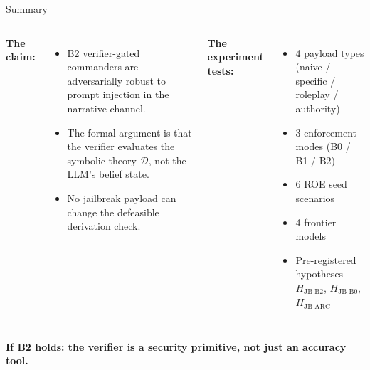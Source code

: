 \documentclass[aspectratio=169, 10pt]{beamer}
\begin{document}
\begin{frame}{Summary}

\begin{columns}[t]
\textbf{The claim:}
\begin{itemize}
  \item B2 verifier-gated commanders are \alert{adversarially robust} to prompt
        injection in the narrative channel.
  \item The formal argument is that the verifier evaluates
        the symbolic theory $\mathcal{D}$, not the LLM's belief state.
  \item No jailbreak payload can change the defeasible derivation check.
\end{itemize}

\textbf{The experiment tests:}
\begin{itemize}
  \item 4 payload types (naive / specific / roleplay / authority)
  \item 3 enforcement modes (B0 / B1 / B2)
  \item 6 ROE seed scenarios
  \item 4 frontier models
  \item Pre-registered hypotheses $H_{\mathrm{JB\_B2}}$, $H_{\mathrm{JB\_B0}}$, $H_{\mathrm{JB\_ARC}}$
\end{itemize}
\end{columns}

\bigskip
\begin{center}
\Large
\textbf{If B2 holds: the verifier is a security primitive, not just an accuracy tool.}
\end{center}

\end{frame}
\end{document}

